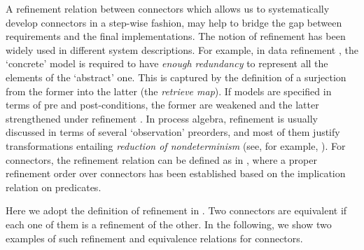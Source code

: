 \documentclass[preprint,3p]{elsarticle}
\begin{document}
A refinement relation between connectors which allows us to systematically develop connectors in a step-wise fashion, may help to bridge
the gap between requirements and the final implementations. The notion of refinement has been widely used in different system descriptions.
For example, in data refinement \cite{RE98}, the `concrete' model is required to have \emph{enough redundancy} to represent all the elements
of the `abstract' one. This is captured by the definition of a surjection from the former into the latter (the \emph{retrieve map}). If
models are specified in terms of pre and post-conditions, the former are weakened and the latter strengthened under refinement \cite{Jon90}.
In process algebra, refinement is usually discussed in terms of several `observation' preorders, and most of them justify
transformations entailing \emph{reduction of nondeterminism} (see, for
example, \cite{Ros98}). For connectors, the refinement relation can be
defined as in \cite{SAA+12}, where a proper refinement order over
connectors has been established based on the implication relation on
predicates.

Here we adopt the definition of refinement in \cite{SAA+12}. Two connectors are equivalent if each one of them is a refinement of the other.
In the following, we show two examples of such refinement and equivalence relations for connectors.
\end{document}
